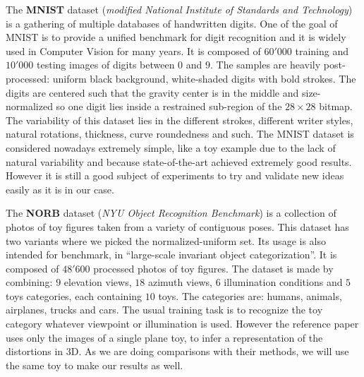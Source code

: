 \documentclass[a4paper,12pt]{report}
\begin{document}
The {\bf MNIST} dataset ({\em modified National Institute of Standards and Technology}) is a gathering of multiple databases of handwritten digits.
One of the goal of MNIST is to provide a unified benchmark for digit recognition and it is widely used in Computer Vision for many years.
It is composed of $60'000$ training and $10'000$ testing images of digits between $0$ and $9$.
The samples are heavily post-processed: uniform black background, white-shaded digits with bold strokes.
The digits are centered such that the gravity center is in the middle and size-normalized so one digit lies inside a restrained sub-region of the $28 \times 28$ bitmap.
The variability of this dataset lies in the different strokes, different writer styles, natural rotations, thickness, curve roundedness and such.
The MNIST dataset is considered nowadays extremely simple, like a toy example due to the lack of natural variability and because state-of-the-art achieved extremely good results.
However it is still a good subject of experiments to try and validate new ideas easily as it is in our case.

The {\bf NORB} dataset ({\em NYU Object Recognition Benchmark}) is a collection of photos of toy figures taken from a variety of contiguous poses.
This dataset has two variants where we picked the normalized-uniform set.
Its usage is also intended for benchmark, in ``large-scale invariant object categorization''.
It is composed of $48'600$ processed photos of toy figures.
The dataset is made by combining: $9$ elevation views, $18$ azimuth views, $6$ illumination conditions and $5$ toys categories, each containing $10$ toys.
The categories are: humans, animals, airplanes, trucks and cars.
The usual training task is to recognize the toy category whatever viewpoint or illumination is used.
However the reference paper uses only the images of a single plane toy, to infer a representation of the distortions in 3D.
As we are doing comparisons with their methods, we will use the same toy to make our results as well.
\end{document}
